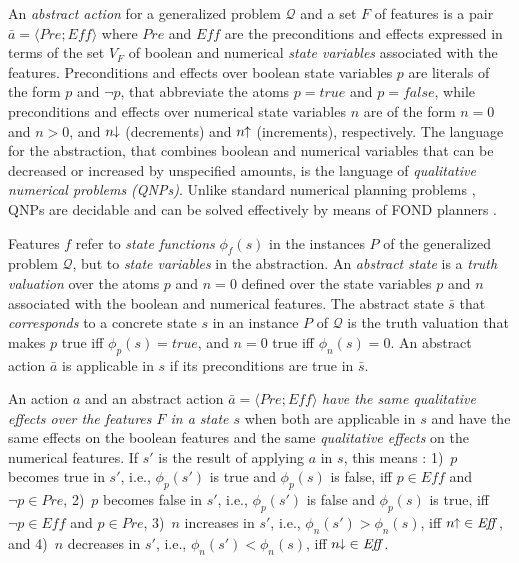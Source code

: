 \documentclass[letterpaper]{article} %
\newcommand{\tup}[1]{\langle #1 \rangle}
\newcommand{\Q}{\mathcal{Q}}
\newcommand{\Eff}{{\mathit{Eff}}}
\newcommand{\abst}[2]{\tup{#1;#2}}
\newcommand{\pplus}{\hspace{-.05em}\raisebox{.15ex}{\footnotesize$\uparrow$}}
\newcommand{\mminus}{\hspace{-.05em}\raisebox{.15ex}{\footnotesize$\downarrow$}}
\begin{document}
An \emph{abstract action}  for a generalized problem $\Q$ and a set $F$ of features
is a pair $\bar{a}=\abst{Pre}{\Eff}$ where $Pre$ and $\Eff$ are the  preconditions
and effects expressed in terms of the  set $V_F$ of boolean and numerical \emph{state variables}
associated with the features. Preconditions and effects over boolean state variables $p$ are literals of the form $p$
and $\neg p$, that abbreviate the  atoms $p=true$ and $p=false$, while
preconditions and effects over  numerical state variables $n$ are of  the form $n=0$ and $n > 0$,
and   $n\mminus$ (decrements) and  $n\pplus$ (increments), respectively.
The language for the abstraction,  that combines boolean and numerical variables
that can be decreased or increased by unspecified amounts, is the language of \emph{qualitative numerical problems (QNPs)}.
Unlike standard numerical planning problems \cite{helmert:numerical}, QNPs
are decidable and can be solved effectively by means of  FOND planners \cite{srivastava:aaai2011,bonet:ijcai2017}.


Features $f$ refer to \emph{state functions} $\phi_f(s)$ in the instances $P$ 
of the generalized problem $\Q$, but  to \emph{state variables} in  the abstraction.
An \emph{abstract state} is  a \emph{truth valuation} over
the atoms $p$ and $n=0$ defined over the state variables $p$ and $n$
associated with the boolean and  numerical features.
The abstract state $\bar{s}$ that \emph{corresponds} to a concrete state $s$
in an instance $P$ of $\Q$ is the truth valuation that makes $p$ true iff $\phi_p(s)=true$,
and $n=0$ true iff $\phi_n(s) = 0$. An abstract action $\bar{a}$ is applicable in  $s$
if its preconditions
are true in $\bar{s}$. 

An action $a$ and an abstract action $\bar{a}=\abst{Pre}{\Eff}$  \emph{have  the same qualitative effects over the features $F$
in a state $s$} when both are applicable in $s$ and have the same effects on the boolean features and
the same \emph{qualitative effects} on the numerical features. If $s'$ is the result of applying $a$ in $s$,
this means \cite{bonet:ijcai2018}: 
1)~$p$ becomes true in $s'$,
i.e., $\phi_p(s')$ is true and $\phi_p(s)$  is false,
iff $p \in \Eff$ and $\neg p \in Pre$, 2)~$p$ becomes false in $s'$, i.e., $\phi_p(s')$ is false and $\phi_p(s)$  is true,
iff $\neg p \in \Eff$ and $p \in Pre$, 3)~$n$ increases in $s'$, i.e., $\phi_n(s') > \phi_n(s)$, iff $n\pplus \in \Eff$,
and 4)~$n$ decreases  in $s'$, i.e., $\phi_n(s') < \phi_n(s)$, iff $n\mminus \in \Eff$.
\end{document}
